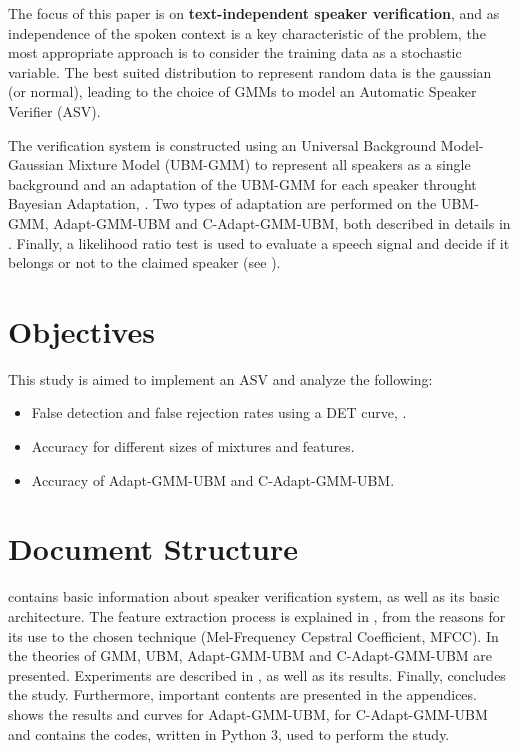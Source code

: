 The focus of this paper is on \textbf{text-independent speaker verification}, and as independence of the spoken context is a key characteristic of the problem, the most appropriate approach is to consider the training data as a stochastic variable. The best suited distribution to represent random data is the gaussian (or normal), leading to the choice of GMMs to model an Automatic Speaker Verifier (ASV).

The verification system is constructed using an Universal Background Model-Gaussian Mixture Model (UBM-GMM) to represent all speakers as a single background and an adaptation of the UBM-GMM for each speaker throught Bayesian Adaptation, . Two types of adaptation are performed on the UBM-GMM, Adapt-GMM-UBM and C-Adapt-GMM-UBM, both described in details in . Finally, a likelihood ratio test is used to evaluate a speech signal and decide if it belongs or not to the claimed speaker (see ).


\section{Objectives}

This study is aimed to implement an ASV and analyze the following:

\begin{itemize}\itemsep0pt
    \item False detection and false rejection rates using a DET curve, .
    \item Accuracy for different sizes of mixtures and features.
    \item Accuracy of Adapt-GMM-UBM and C-Adapt-GMM-UBM.
\end{itemize}

\section{Document Structure}

 contains basic information about speaker verification system, as well as its basic architecture. The feature extraction process is explained in , from the reasons for its use to the chosen technique (Mel-Frequency Cepstral Coefficient, MFCC). In  the theories of GMM, UBM, Adapt-GMM-UBM and C-Adapt-GMM-UBM are presented. Experiments are described in , as well as its results. Finally,  concludes the study. Furthermore, important contents are presented in the appendices.  shows the results and curves for Adapt-GMM-UBM,  for C-Adapt-GMM-UBM and  contains the codes, written in Python 3, used to perform the study.